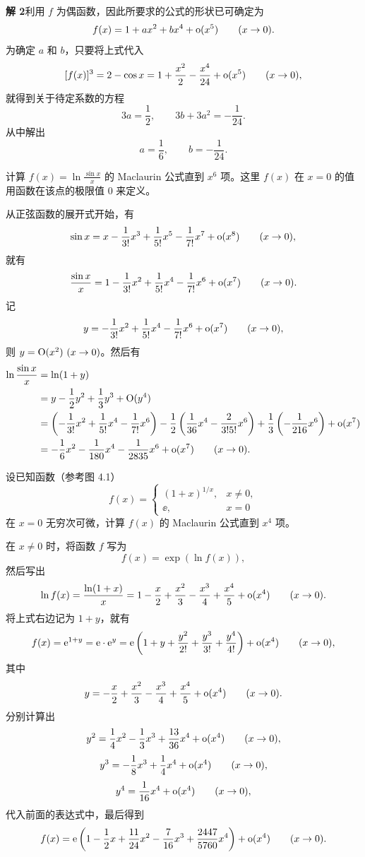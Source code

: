 \begin{xsolution}
\textbf{解 2}\quad 利用 $f$ 为偶函数，因此所要求的公式的形状已可确定为
\[
  f(x)=1+ax^2+bx^4+\mathrm{o}(x^5)\qquad(x\to0).
\]
为确定 $a$ 和 $b$，只要将上式代入
\[
  [f(x)]^3=2-\cos x=1+\frac{x^2}{2}-\frac{x^4}{24}+\mathrm{o}(x^5)\qquad(x\to0),
\]
就得到关于待定系数的方程
\[
  3a=\frac12,\qquad 3b+3a^2=-\frac{1}{24}.
\]
从中解出
\[
  a=\frac16,\qquad b=-\frac{1}{24}.
\]
\end{xsolution}

\begin{xexample}[7.2.3]
计算 $f(x)=\ln\frac{\sin x}{x}$ 的 Maclaurin 公式直到 $x^6$ 项。这里 $f(x)$ 在 $x=0$ 的值用函数在该点的极限值 0 来定义。
\end{xexample}
\begin{xsolution}
从正弦函数的展开式开始，有
\[
  \sin x=x-\frac{1}{3!}x^3+\frac{1}{5!}x^5-\frac{1}{7!}x^7+\mathrm{o}(x^8)\qquad(x\to0),
\]
就有
\[
  \frac{\sin x}{x}=1-\frac{1}{3!}x^2+\frac{1}{5!}x^4-\frac{1}{7!}x^6+\mathrm{o}(x^7)\qquad(x\to0).
\]
记
\[
  y=-\frac{1}{3!}x^2+\frac{1}{5!}x^4-\frac{1}{7!}x^6+\mathrm{o}(x^7)\qquad(x\to0),
\]
则 $y=\mathrm{O}(x^2)\ (x\to0)$。然后有
\[
  \begin{aligned}
  \ln\frac{\sin x}{x}
  &=\ln(1+y)\\
  &=y-\frac12y^2+\frac13y^3+\mathrm{O}(y^4)\\
  &=\left(-\frac{1}{3!}x^2+\frac{1}{5!}x^4-\frac{1}{7!}x^6\right)
    -\frac12\left(\frac{1}{36}x^4-\frac{2}{3!5!}x^6\right)
    +\frac13\left(-\frac{1}{216}x^6\right)+\mathrm{o}(x^7)\\
  &=-\frac16x^2-\frac{1}{180}x^4-\frac{1}{2835}x^6+\mathrm{o}(x^7)\qquad(x\to0).
  \end{aligned}
\]
\end{xsolution}

\begin{xexample}[7.2.4]
设已知函数（参考图 4.1）
\[
  f(x)=
  \begin{cases}
    (1+x)^{1/x},&x\neq0,\\
    \ee,&x=0
  \end{cases}
\]
在 $x=0$ 无穷次可微，计算 $f(x)$ 的 Maclaurin 公式直到 $x^4$ 项。
\end{xexample}
\begin{xsolution}
在 $x\neq0$ 时，将函数 $f$ 写为
\[
  f(x)=\exp(\ln f(x)),
\]
然后写出
\[
  \ln f(x)=\frac{\ln(1+x)}{x}=1-\frac{x}{2}+\frac{x^2}{3}-\frac{x^3}{4}+\frac{x^4}{5}+\mathrm{o}(x^4)\qquad(x\to0).
\]
将上式右边记为 $1+y$，就有
\[
  f(x)=\mathrm{e}^{1+y}=\mathrm{e}\cdot\mathrm{e}^y
  =\mathrm{e}\left(1+y+\frac{y^2}{2!}+\frac{y^3}{3!}+\frac{y^4}{4!}\right)+\mathrm{o}(x^4)\qquad(x\to0),
\]
其中
\[
  y=-\frac{x}{2}+\frac{x^2}{3}-\frac{x^3}{4}+\frac{x^4}{5}+\mathrm{o}(x^4)\qquad(x\to0).
\]
分别计算出
\[
  y^2=\frac14x^2-\frac13x^3+\frac{13}{36}x^4+\mathrm{o}(x^4)\qquad(x\to0),
\]
\[
  y^3=-\frac18x^3+\frac14x^4+\mathrm{o}(x^4)\qquad(x\to0),
\]
\[
  y^4=\frac{1}{16}x^4+\mathrm{o}(x^4)\qquad(x\to0),
\]
代入前面的表达式中，最后得到
\[
  f(x)=\mathrm{e}\left(1-\frac12x+\frac{11}{24}x^2-\frac{7}{16}x^3+\frac{2447}{5760}x^4\right)+\mathrm{o}(x^4)\qquad(x\to0).
\]
\end{xsolution}

